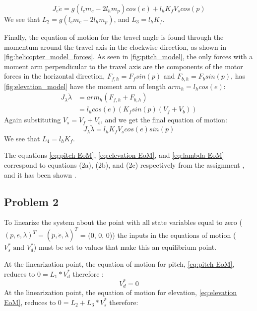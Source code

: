 \begin{equation}
  \label{eq:elevation EoM}
  J_e\ddot{e} = g(l_cm_c - 2l_hm_p)cos(e) + l_hK_fV_scos(p)
\end{equation}
We see that $L_2 = g(l_cm_c-2l_hm_p)$, and $L_3 = l_hK_f$.

Finally, the equation of motion for the travel angle is found through
the momentum around the travel axis in the  clockwise direction, as shown in \cref{fig:helicopter_model_forces}. As seen in \cref{fig:pitch_model}, the only forces with a moment arm perpendicular to the travel axis are the components of the motor forces in the horizontal direction, $F_{f,h} = F_fsin(p)$ and $F_{b,h} = F_bsin(p)$, has \cref{fig:elevation_model} have the moment arm of length $arm_h =
l_hcos(e)$:
\begin{align*}
  J_\lambda\ddot{\lambda} &= arm_h(F_{f,h} + F_{b,h}) \\
													&= l_hcos(e)(K_fsin(p)(V_f + V_b))
\end{align*}
Again substituting $V_s = V_f + V_b$, and we get the final equation of motion:
\begin{equation}
\label{eq:lambda EoM}
J_\lambda\ddot{\lambda} = l_hK_fV_scos(e)sin(p)
\end{equation}
We see that $L_4 = l_hK_f$.

The equations \cref{eq:pitch EoM}, \cref{eq:elevation EoM}, and \cref{eq:lambda EoM} correspond to equations (2a), (2b), and (2c) respectively from the assignment \cite[p.13]{assignment}, and it has been shown .

\subsection{Problem 2}
To linearize the system about the point with all state variables equal
to zero ($(p, e, \lambda)^T = (\dot{p},\dot{e},\dot{\lambda})^T $ = (0, 0, 0))
the inputs in the equations of motion ($V^{*}_{s} \text{ and } V^{*}_{d}$) must be set to
values that make this an equilibrium point.

At the linearization point, the equation of motion for pitch,
\cref{eq:pitch EoM}, reduces to $0 = L_{1} *
V^{*}_{d}$ therefore
:
\begin{equation}
  \label{eq:V^*_d value}
  V^{*}_{d} = 0
\end{equation}
At the linearization point, the equation of motion for elevation,
\cref{eq:elevation EoM}, reduces to $0 = L_{2} +
L_{3}*V^{*}_{s}$ therefore:

